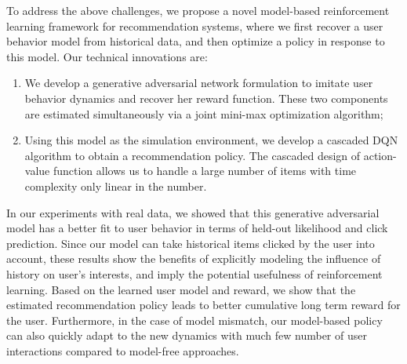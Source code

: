 \documentclass{article} %
\newcommand{\Le}[1]{{\color{red}{\bf\sf [ #1]}}}
\newcommand{\shuang}[1]{{\color{purple}{\bf\sf[ #1]}}}
\begin{document}
To address the above challenges, we propose a novel model-based reinforcement learning framework for recommendation systems, where we first recover a user behavior model from historical data, and then optimize a policy in response to this model. Our technical innovations are:
\begin{enumerate}
    \item We develop a generative adversarial network formulation to imitate user behavior dynamics and recover her reward function. These two components are estimated simultaneously via a joint mini-max optimization algorithm;
    \item Using this model as the simulation environment, we develop a cascaded DQN algorithm to obtain a recommendation policy. The cascaded design of action-value function allows us to handle a large number of items with time complexity only linear in the number.
\end{enumerate}
In our experiments with real data, we showed that this generative adversarial model has a better fit to user behavior in terms of held-out likelihood and click prediction. Since our model can take historical items clicked by the user into account, these results show the benefits of explicitly modeling the influence of history on user's interests, and imply the potential usefulness of reinforcement learning. Based on the learned user model and reward, we show that the estimated recommendation policy leads to better cumulative long term reward for the user. Furthermore, in the case of model mismatch, our model-based policy can also quickly adapt to the new dynamics with much few number of user interactions compared to model-free approaches.

\end{document}
